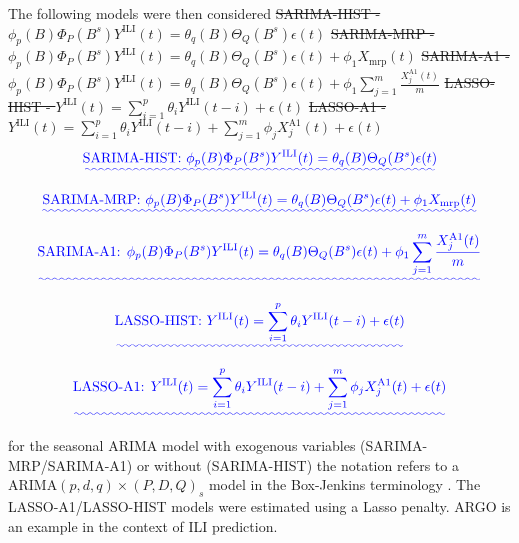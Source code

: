 \documentclass[fleqn,10pt]{wlscirep}
\providecommand{\DIFadd}[1]{{\protect\color{blue}\uwave{#1}}} %
\providecommand{\DIFdel}[1]{{\protect\color{red}\sout{#1}}}                      %
\providecommand{\DIFaddbegin}{} %
\providecommand{\DIFaddend}{} %
\providecommand{\DIFdelbegin}{} %
\providecommand{\DIFdelend}{} %
\begin{document}
The following models were then considered
\DIFdelbegin %
\DIFdel{SARIMA-HIST - $\phi_p(B)\Phi_P(B^s)Y^{\text{ILI}}(t) = \theta_q(B)\Theta_Q(B^s)\epsilon(t)$ }%
\DIFdel{SARIMA-MRP - $\phi_p(B)\Phi_P(B^s)Y^{\text{ILI}}(t) =  \theta_q(B)\Theta_Q(B^s)\epsilon(t) + \phi_1 X_{\text{mrp}}(t)$ 
}%
\DIFdel{SARIMA-A1 - $\phi_p(B)\Phi_P(B^s)Y^{\text{ILI}}(t) =  \theta_q(B)\Theta_Q(B^s)\epsilon(t) + \phi_1 \sum_{j=1}^m \frac{X_j^{\text{A1}}(t)}{m}$ 
}%
\DIFdel{LASSO-HIST - $Y^{\text{ILI}}(t) = \sum_{i=1}^p \theta_i Y^{\text{ILI}}(t-i)+\epsilon(t)$
}%
\DIFdel{LASSO-A1 - $Y^{\text{ILI}}(t) = \sum_{i=1}^p \theta_i Y^{\text{ILI}}(t-i) +  \sum_{j=1}^m \phi_j X_j^{\text{A1}}(t) + \epsilon(t)$
}%
\DIFdelend \DIFaddbegin \begin{equation}
 \DIFadd{\text{SARIMA-HIST: } 
 \phi_p(B)\Phi_P(B^s)Y^{\text{ILI}}(t) = \theta_q(B)\Theta_Q(B^s)\epsilon(t) 
 }\end{equation}

 \begin{equation}
 \DIFadd{\text{SARIMA-MRP: }  
 \phi_p(B)\Phi_P(B^s)Y^{\text{ILI}}(t) =  \theta_q(B)\Theta_Q(B^s)\epsilon(t) + \phi_1 X_{\text{mrp}}(t)
}\end{equation}

\begin{equation}
\DIFadd{\text{SARIMA-A1: } \phi_p(B)\Phi_P(B^s)Y^{\text{ILI}}(t) =  \theta_q(B)\Theta_Q(B^s)\epsilon(t) + \phi_1 \sum_{j=1}^m \frac{X_j^{\text{A1}}(t)}{m}
}\end{equation}

\begin{equation}
\DIFadd{\text{LASSO-HIST: } Y^{\text{ILI}}(t) = \sum_{i=1}^p \theta_i Y^{\text{ILI}}(t-i)+\epsilon(t)
}\end{equation}

\begin{equation}
\DIFadd{\text{LASSO-A1: } Y^{\text{ILI}}(t) = \sum_{i=1}^p \theta_i Y^{\text{ILI}}(t-i) +  \sum_{j=1}^m \phi_j X_j^{\text{A1}}(t) + \epsilon(t)
}\end{equation}

\DIFaddend for the seasonal ARIMA model with exogenous variables (SARIMA-MRP/SARIMA-A1) or without (SARIMA-HIST) the notation refers to a ARIMA$(p,d,q)\times(P,D,Q)_s$ model in the Box-Jenkins terminology \cite{box_etal_2015}. The LASSO-A1/LASSO-HIST models were estimated using a Lasso penalty. ARGO \cite{yang_etal_2015inference, yang_etal_2015} is an example in the context of ILI prediction.  
\end{document}
